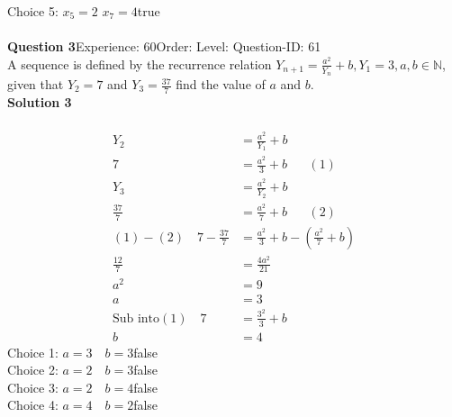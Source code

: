 \documentclass{article}
\begin{document}
Choice 5: \hspace{20pt}$x_5=2 \,\, x_7=4$\hspace{20pt}true\\
\\[4pt]
\noindent\textbf{Question 3}\hspace{20pt}Experience: 60\hspace{20pt}Order: \hspace{20pt}Level: \hspace{20pt}Question-ID: 61\\[2pt]
A sequence is defined by the recurrence relation $Y_{n+1}=\displaystyle\frac{a^2}{Y_n}+b, Y_1=3, a,b \in \mathbb{N}$, given that $Y_2=7$ and $Y_3=\displaystyle\frac{37}{7}$ find the value of $a$ and $b$.\\[4pt]
\noindent\textbf{Solution 3}\\[2pt]
\\[-35pt]\begin{align*}
Y_2&=\displaystyle\frac{a^2}{Y_1}+b\\[2pt]
7&=\displaystyle\frac{a^2}{3}+b\hspace{20pt}(1)\\[12pt]
Y_3&=\displaystyle\frac{a^2}{Y_2}+b\\[2pt]
\displaystyle\frac{37}{7}&=\displaystyle\frac{a^2}{7}+b\hspace{20pt}(2)\\[2pt]
(1)-(2)\quad 7-\displaystyle\frac{37}{7}&=\frac{a^2}{3}+b-\left(\frac{a^2}{7}+b\right)\\[2pt]
\displaystyle\frac{12}{7}&=\displaystyle\frac{4a^2}{21}\\[2pt]
a^2&=9\\[2pt]
a&=3\\[12pt]
\text{Sub into} (1)\quad 7&=\displaystyle\frac{3^2}{3}+b\\[2pt]
b&=4
\end{align*}
Choice 1: \hspace{20pt}$a=3\quad b=3$\hspace{20pt}false\\
Choice 2: \hspace{20pt}$a=2\quad b=3$\hspace{20pt}false\\
Choice 3: \hspace{20pt}$a=2\quad b=4$\hspace{20pt}false\\
Choice 4: \hspace{20pt}$a=4\quad b=2$\hspace{20pt}false\\
\end{document}

